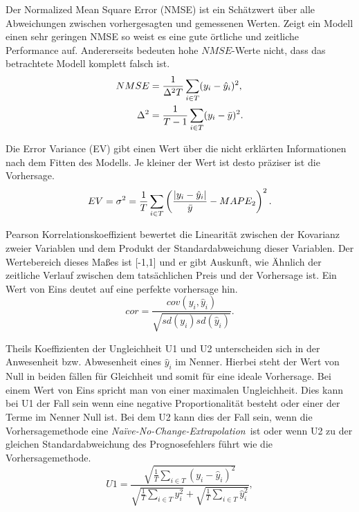 Der Normalized Mean Square Error (NMSE) ist ein Schätzwert über alle Abweichungen zwischen vorhergesagten und gemessenen Werten. Zeigt ein Modell einen sehr geringen NMSE so weist es eine gute örtliche und zeitliche Performance auf. Andererseits bedeuten hohe $NMSE$-Werte nicht, dass das betrachtete Modell komplett falsch ist.
\begin{gather}
\begin{aligned}
NMSE &= \frac{1}{\Delta^2 T} \sum\limits_{i \in T} (y_i-\hat{y}_i)^2,\\ 
\Delta^2 &= \frac{1}{T-1} \sum\limits_{i \in T} (y_i-\bar{y})^2.\\
\end{aligned}
\label{gl:NMSE}
\end{gather}


Die Error Variance (EV) gibt einen Wert über die nicht erklärten Informationen nach dem Fitten des Modells. Je kleiner der Wert ist desto präziser ist die Vorhersage.\,
\begin{equation}
EV= \sigma^2 = \frac{1}{T} \sum\limits_{i \in T} \left ( \frac{\abs{y_i-\hat{y}_i}}{\bar{y}} - MAPE_2  \right ) ^2.
\label{gl:EV}
\end{equation}

Pearson Korrelationskoeffizient bewertet die Linearität zwischen der Kovarianz zweier Variablen und dem Produkt der Standardabweichung dieser Variablen. Der Wertebereich dieses Maßes ist [-1,1] und er gibt Auskunft, wie Ähnlich der zeitliche Verlauf zwischen dem tatsächlichen Preis und der Vorhersage ist. Ein Wert von Eins deutet auf eine perfekte vorhersage hin.\, 
\begin{equation}
cor = \frac{cov(y_i,\hat{y}_i)}{\sqrt{sd(y_i)sd(\hat{y}_i)}} .
\label{gl:cor}
\end{equation}


Theils Koeffizienten der Ungleichheit U1 und U2 unterscheiden sich in der Anwesenheit bzw. Abwesenheit eines $\hat{y}_i$ im Nenner. Hierbei steht der Wert von Null in beiden fällen für Gleichheit und somit für eine ideale Vorhersage. Bei einem Wert von Eins spricht man von einer maximalen Ungleichheit. Dies kann bei U1 der Fall sein wenn eine negative Proportionalität besteht oder einer der Terme im Nenner Null ist. Bei dem U2 kann dies der Fall sein, wenn die Vorhersagemethode eine \textit{Na\"{i}ve-No-Change-Extrapolation}\, ist oder wenn U2 zu der gleichen Standardabweichung des Prognosefehlers führt wie die Vorhersagemethode.\,
\begin{equation}
U1 = \frac{\sqrt{\frac{1}{T} \sum_{i \in T} (y_i-\hat{y}_i)^2}}{ \sqrt{\frac{1}{T} \sum_{i \in T} y_i^2} + \sqrt{\frac{1}{T} \sum_{i \in T} \hat{y}_i^2}},
\label{gl:U1}
\end{equation}

